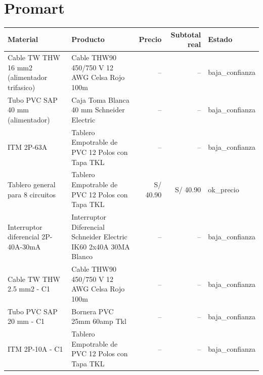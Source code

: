 \documentclass[11pt,a4paper]{article}
\begin{document}
\section{Promart}
\begin{longtable}{p{} p{} r r p{}}
\toprule Material & Producto & Precio & Subtotal real & Estado \\ \midrule\endhead
Cable TW THW 16 mm2 (alimentador trifasico) & Cable THW90 450/750 V 12 AWG Celsa Rojo 100m & -- & -- & baja\_confianza \\
Tubo PVC SAP 40 mm (alimentador) & Caja Toma Blanca 40 mm Schneider Electric & -- & -- & baja\_confianza \\
ITM 2P-63A & Tablero Empotrable de PVC 12 Polos con Tapa TKL & -- & -- & baja\_confianza \\
Tablero general para 8 circuitos & Tablero Empotrable de PVC 12 Polos con Tapa TKL & S/ 40.90 & S/ 40.90 & ok\_precio \\
Interruptor diferencial 2P-40A-30mA & Interruptor Diferencial Schneider Electric IK60 2x40A 30MA Blanco & -- & -- & baja\_confianza \\
Cable TW THW 2.5 mm2 - C1 & Cable THW90 450/750 V 12 AWG Celsa Rojo 100m & -- & -- & baja\_confianza \\
Tubo PVC SAP 20 mm - C1 & Bornera PVC 25mm 60amp Tkl & -- & -- & baja\_confianza \\
ITM 2P-10A - C1 & Tablero Empotrable de PVC 12 Polos con Tapa TKL & -- & -- & baja\_confianza \\
\bottomrule\end{longtable}
\end{document}
